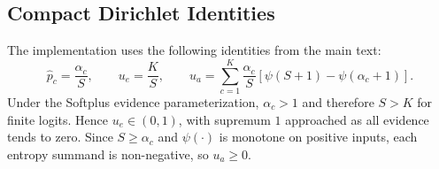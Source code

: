 \documentclass[letterpaper]{article} %
\begin{document}
\subsection{Compact Dirichlet Identities}
The implementation uses the following identities from the main text:
\begin{equation}
    \hat{p}_c=\frac{\alpha_c}{S},\qquad
    u_e=\frac{K}{S},\qquad
    u_a=\sum_{c=1}^{K}\frac{\alpha_c}{S}
    \left[\psi(S+1)-\psi(\alpha_c+1)\right].
\end{equation}
Under the Softplus evidence parameterization, $\alpha_c>1$ and therefore $S>K$ for finite logits. Hence $u_e\in(0,1)$, with supremum $1$ approached as all evidence tends to zero. Since $S\ge \alpha_c$ and $\psi(\cdot)$ is monotone on positive inputs, each entropy summand is non-negative, so $u_a\ge0$.
\end{document}
